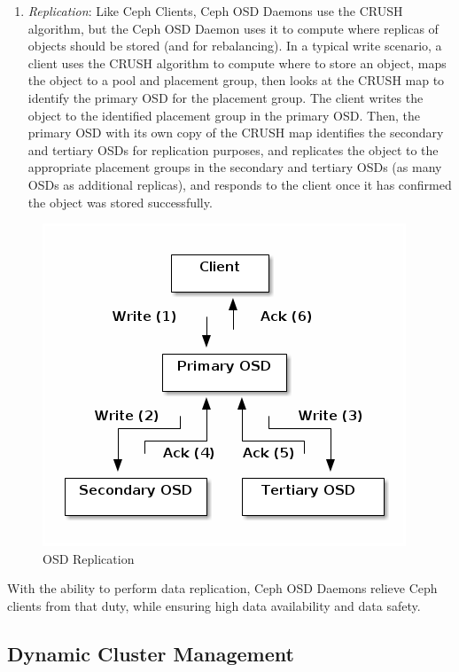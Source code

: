 \documentclass[12pt,a4paper]{report}
\begin{document}
\begin{enumerate}
	\item \emph{Replication}: Like Ceph Clients, Ceph OSD Daemons use the
		CRUSH algorithm, but the Ceph OSD Daemon uses it to compute
		where replicas of objects should be stored (and for
		rebalancing). In a typical write scenario, a client uses the
		CRUSH algorithm to compute where to store an object, maps the
		object to a pool and placement group, then looks at the CRUSH
		map to identify the primary OSD for the placement group.  The
		client writes the object to the identified placement group in
		the primary OSD. Then, the primary OSD with its own copy of the
		CRUSH map identifies the secondary and tertiary OSDs for
		replication purposes, and replicates the object to the
		appropriate placement groups in the secondary and tertiary OSDs
		(as many OSDs as additional replicas), and responds to the
		client once it has confirmed the object was stored
		successfully.
\end{enumerate}

\begin{figure}[h]
	\includegraphics[scale=0.60]{replication.png}
	\caption{OSD Replication}
	\label{fig:osd_replication}
\end{figure}

With the ability to perform data replication, Ceph OSD Daemons relieve Ceph
clients from that duty, while ensuring high data availability and data safety.

\subsection{Dynamic Cluster Management}
\end{document}
